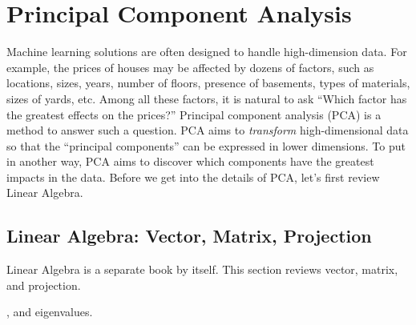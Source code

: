 \chapter{Principal Component Analysis}
\label{chapter:pca}

Machine learning solutions are often designed to handle high-dimension
data. For example, the prices of houses may be affected by dozens of
factors, such as locations, sizes, years, number of floors, presence
of basements, types of materials, sizes of yards, etc.  Among all
these factors, it is natural to ask ``Which factor has the greatest
effects on the prices?''  Principal component analysis (PCA) is a
method to answer such a question.  PCA aims to {\it transform}
high-dimensional data so that the ``principal components'' can be
expressed in lower dimensions.  To put in another way, PCA aims to
discover which components have the greatest impacts in the data.
Before we get into the details of PCA, let's first review Linear
Algebra.

\section{Linear Algebra: Vector, Matrix, Projection}

Linear Algebra is a separate book by itself. This section reviews
vector, matrix, and projection.

, and eigenvalues.




